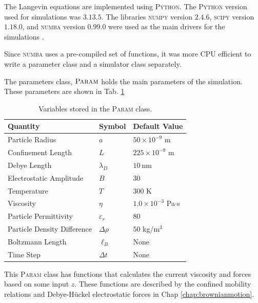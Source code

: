 The Langevin equations are implemented using \textsc{Python}. The \textsc{Python} version used for simulations was $3.13.5$. The libraries \textsc{numpy} version $2.4.6$, \textsc{scipy} version $1.18.0$, and \textsc{numba} version $0.99.0$ were used as the main drivers for the simulations \cite{python3, harris2020array, lam2015numba}. 

Since \textsc{numba} uses a pre-compiled set of functions, it was more CPU efficient to write a parameter class and a simulator class separately.

The parameters class, $\textsc{Param}$ holds the main parameters of the simulation. These parameters are shown in Tab. \ref{tab:sim_params}
\begin{table}[h!]
    \centering
    \begin{tabularx}{0.65\textwidth}{@{}Xll@{}}
        \toprule
        \textbf{Quantity} & \textbf{Symbol} & \textbf{Default Value}\\
        \midrule
        Particle Radius & $a$ & $50 \times 10^{-9}$ m \\
        Confinement Length & $L$ & $225 \times 10^{-9}$ m \\
        Debye Length & $\lambda_D$ & $\SI{10}{\nm}$ \\
        Electrostatic Amplitude & $B$ & $30$ \\
        Temperature & $T$ & $300$ K \\
        Viscosity & $\eta$ & $1.0 \times 10^{-3}$ Pa$\cdot$s \\
        Particle Permittivity & $\varepsilon_r$ & $80$ \\
        Particle Density Difference & $\Delta\rho$ & $50$ kg/m$^3$ \\
        Boltzmann Length & $\ell_B$ & None \\
        Time Step & $\Delta t$ & None \\
        \bottomrule
    \end{tabularx}
    \caption{Variables stored in the \textsc{Param} class.}
    \label{tab:sim_params}
\end{table}

This \textsc{Param} class has functions that calculates the current viscosity and forces based on some input $z$. These functions are described by the confined mobility relations and Debye-Hückel electrostatic forces in Chap \ref{chap:brownianmotion}.

